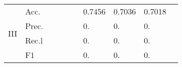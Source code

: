 \begin{tabular}{clllllllll}
    \midrule
    \multirow{4}{*}{III}              & Acc.                                                 &                         &                         &                              &                         & 0.7456                                                                       & 0.7036                                                                      & 0.7018                                    &                                           \\
                                      & Prec.                                                &                         &                         &                              &                         & 0.                                                                           & 0.                                                                          & 0.                                        &                                           \\
                                      & Rec.l                                                &                         &                         &                              &                         & 0.                                                                           & 0.                                                                          & 0.                                        &                                           \\
                                      & F1                                                   &                         &                         &                              &                         & 0.                                                                           & 0.                                                                          & 0.                                        &                                           \\
    \bottomrule
    \end{tabular}